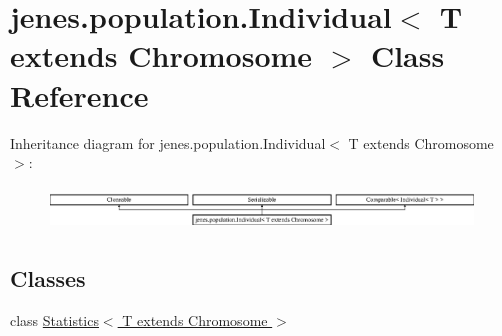 \hypertarget{classjenes_1_1population_1_1_individual_3_01_t_01extends_01_chromosome_01_4}{\section{jenes.\-population.\-Individual$<$ T extends Chromosome $>$ Class Reference}
\label{classjenes_1_1population_1_1_individual_3_01_t_01extends_01_chromosome_01_4}
}
Inheritance diagram for jenes.\-population.\-Individual$<$ T extends Chromosome $>$\-:\begin{figure}[H]
\begin{center}
\leavevmode
\includegraphics[height=1.141692cm]{classjenes_1_1population_1_1_individual_3_01_t_01extends_01_chromosome_01_4}
\end{center}
\end{figure}
\subsection*{Classes}
\begin{DoxyCompactItemize}
\item 
class \hyperlink{classjenes_1_1population_1_1_individual_3_01_t_01extends_01_chromosome_01_4_1_1_statistics_3_01_t_01extends_01_chromosome_01_4}{Statistics$<$ T extends Chromosome $>$}
\end{DoxyCompactItemize}
